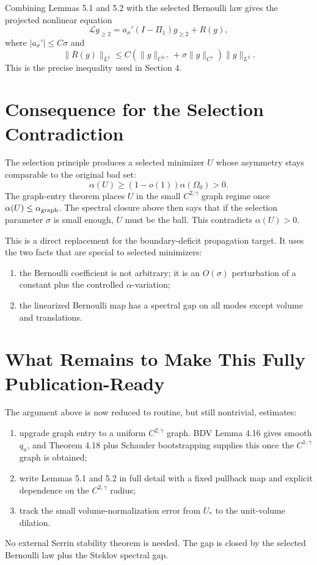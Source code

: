 \documentclass[11pt]{article}
\begin{document}
Combining Lemmas 5.1 and 5.2 with the selected Bernoulli law gives the
projected nonlinear equation
\[
\mathcal L g_{\ge2}
=
a_\sigma'(I-\Pi_1)g_{\ge2}
+R(g),
\]
where \(|a_\sigma'|\le C\sigma\) and
\[
\|R(g)\|_{L^2}
\le C(\|g\|_{C^{2,\gamma}}+\sigma\|g\|_{C^1})\|g\|_{L^2}.
\]
This is the precise inequality used in Section 4.

\section{Consequence for the Selection Contradiction}

The selection principle produces a selected minimizer \(U\) whose asymmetry
stays comparable to the original bad set:
\[
\alpha(U)\ge (1-o(1))\alpha(\Omega_0)>0.
\]
The graph-entry theorem places \(U\) in the small \(C^{2,\gamma}\) graph regime
once \(\alpha(U)\le\alpha_{\rm graph}\). The spectral closure above then says
that if the selection parameter \(\sigma\) is small enough, \(U\) must be the
ball. This contradicts \(\alpha(U)>0\).

This is a direct replacement for the boundary-deficit propagation target. It
uses the two facts that are special to selected minimizers:
\begin{enumerate}
\item the Bernoulli coefficient is not arbitrary; it is an \(O(\sigma)\)
perturbation of a constant plus the controlled \(\alpha\)-variation;
\item the linearized Bernoulli map has a spectral gap on all modes except
volume and translations.
\end{enumerate}

\section{What Remains to Make This Fully Publication-Ready}

The argument above is now reduced to routine, but still nontrivial, estimates:
\begin{enumerate}
\item upgrade graph entry to a uniform \(C^{2,\gamma}\) graph. BDV Lemma 4.16
gives smooth \(q_u\), and Theorem 4.18 plus Schauder bootstrapping supplies
this once the \(C^{1,\gamma}\) graph is obtained;
\item write Lemmas 5.1 and 5.2 in full detail with a fixed pullback map and
explicit dependence on the \(C^{2,\gamma}\) radius;
\item track the small volume-normalization error from \(U_*\) to the
unit-volume dilation.
\end{enumerate}
No external Serrin stability theorem is needed. The gap is closed by the
selected Bernoulli law plus the Steklov spectral gap.
\end{document}
